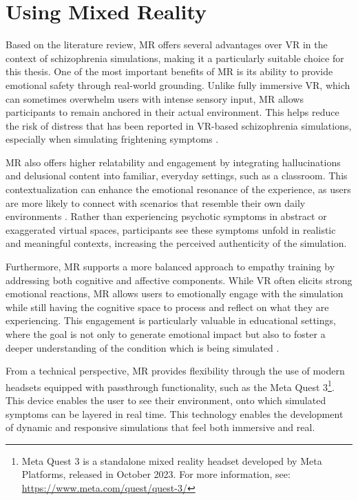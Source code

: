 \section{Using Mixed Reality}

Based on the literature review, MR offers several advantages over VR in the context of schizophrenia simulations, making it a particularly suitable choice for this thesis. One of the most important benefits of MR is its ability to provide emotional safety through real-world grounding. Unlike fully immersive VR, which can sometimes overwhelm users with intense sensory input, MR allows participants to remain anchored in their actual environment. This helps reduce the risk of distress that has been reported in VR-based schizophrenia simulations, especially when simulating frightening symptoms \cite{Zare-Bidaki2022}.

MR also offers higher relatability and engagement by integrating hallucinations and delusional content into familiar, everyday settings, such as a classroom. This contextualization can enhance the emotional resonance of the experience, as users are more likely to connect with scenarios that resemble their own daily environments \cite{Krogmeier2024}. Rather than experiencing psychotic symptoms in abstract or exaggerated virtual spaces, participants see these symptoms unfold in realistic and meaningful contexts, increasing the perceived authenticity of the simulation.

Furthermore, MR supports a more balanced approach to empathy training by addressing both cognitive and affective components. While VR often elicits strong emotional reactions, MR allows users to emotionally engage with the simulation while still having the cognitive space to process and reflect on what they are experiencing. This engagement is particularly valuable in educational settings, where the goal is not only to generate emotional impact but also to foster a deeper understanding of the condition which is being simulated \cite{Martingano2021, Rueda2020}.

From a technical perspective, MR provides flexibility through the use of modern headsets equipped with passthrough functionality, such as the Meta Quest 3\footnote{Meta Quest 3 is a standalone mixed reality headset developed by Meta Platforms, released in October 2023. For more information, see: \url{https://www.meta.com/quest/quest-3/}}.
This device enables the user to see their environment, onto which simulated symptoms can be layered in real time. This technology enables the development of dynamic and responsive simulations that feel both immersive and real.

